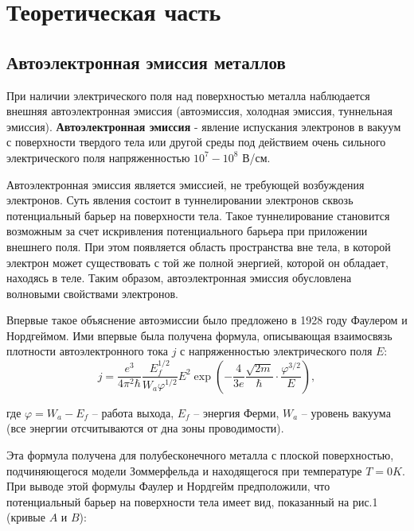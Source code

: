 \documentclass[12pt,a4paper]{article}
\begin{document}
\section{Теоретическая часть}
\subsection{Автоэлектронная эмиссия металлов}

При наличии электрического поля над поверхностью металла наблюдается внешняя автоэлектронная эмиссия (автоэмиссия, холодная эмиссия, туннельная эмиссия). \textbf{Автоэлектронная эмиссия} - явление испускания электронов в вакуум с поверхности твердого тела или другой среды под действием очень сильного электрического поля напряженностью $10^{7}-10^{8}$ В/см.

Автоэлектронная эмиссия является эмиссией, не требующей возбуждения электронов. Суть явления состоит в туннелировании электронов сквозь потенциальный барьер на поверхности тела. Такое туннелирование становится возможным за счет искривления потенциального барьера при приложении внешнего поля. При этом появляется область пространства вне тела, в которой электрон может существовать с той же полной энергией, которой он обладает, находясь в теле. Таким образом, автоэлектронная эмиссия обусловлена волновыми свойствами электронов.

Впервые такое объяснение автоэмиссии было предложено в 1928 году Фаулером и Нордгеймом. Ими впервые была получена формула, описывающая взаимосвязь плотности автоэлектронного тока $j$ с напряженностью электрического поля $E$:
\begin{equation}
    j = \frac{e^3}{4\pi^2\hbar}\frac{E_f^{1/2}}{W_a\varphi^{1/2}} E^2 \exp(-\frac{4}{3e}\frac{\sqrt{2m}}{\hbar}\cdot\frac{\varphi^{3/2}}{E}),
\end{equation}

где $\varphi = W_{a} - E_{f}$ – работа выхода, $E_{f}$ – энергия Ферми, $W_{a}$ – уровень вакуума (все энергии отсчитываются от дна зоны проводимости).

Эта формула получена для полубесконечного металла с плоской поверхностью, подчиняющегося модели Зоммерфельда и находящегося при температуре $T = 0 K$.
При выводе этой формулы Фаулер и Нордгейм предположили, что потенциальный барьер на поверхности тела имеет вид, показанный на  рис.1 (кривые $A$ и $B$):
\end{document}
